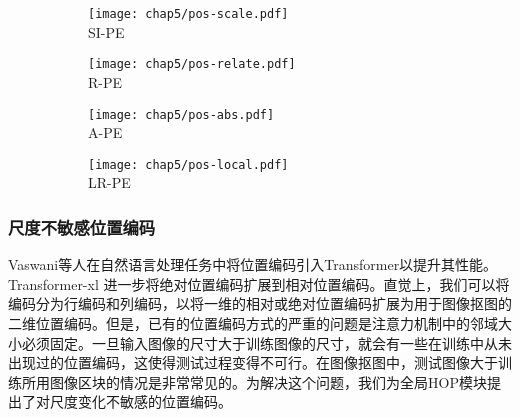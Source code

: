 \begin{figure}[t]
	\begin{subfigure}{0.45\textwidth}
	{
		\centering
		\texttt{[image: chap5/pos-scale.pdf]}\\
		\centering SI-PE
	}	
\end{subfigure}	
	\begin{subfigure}{0.45\textwidth}
	{
		\centering
		\texttt{[image: chap5/pos-relate.pdf]}\\
		\centering R-PE
	}	
\end{subfigure}	

	\begin{subfigure}{0.45\textwidth}
		{
		\centering
		\texttt{[image: chap5/pos-abs.pdf]}\\
		\centering A-PE
	}	
\end{subfigure}	
	\begin{subfigure}{0.45\textwidth}
	{
		\centering
		\texttt{[image: chap5/pos-local.pdf]}\\
		\centering LR-PE
	}
\end{subfigure}	
	\label{fig5:PE}
\end{figure}

\subsubsection{尺度不敏感位置编码}
Vaswani等人\cite{vaswani2017attention}在自然语言处理任务中将位置编码引入Transformer以提升其性能。Transformer-xl \cite{dai2019transformer} 进一步将绝对位置编码扩展到相对位置编码。直觉上，我们可以将编码分为行编码和列编码，以将一维的相对或绝对位置编码扩展为用于图像抠图的二维位置编码。但是，已有的位置编码方式的严重的问题是注意力机制中的邻域大小必须固定。一旦输入图像的尺寸大于训练图像的尺寸，就会有一些在训练中从未出现过的位置编码，这使得测试过程变得不可行。在图像抠图中，测试图像大于训练所用图像区块的情况是非常常见的。为解决这个问题，我们为全局HOP模块提出了对尺度变化不敏感的位置编码。

